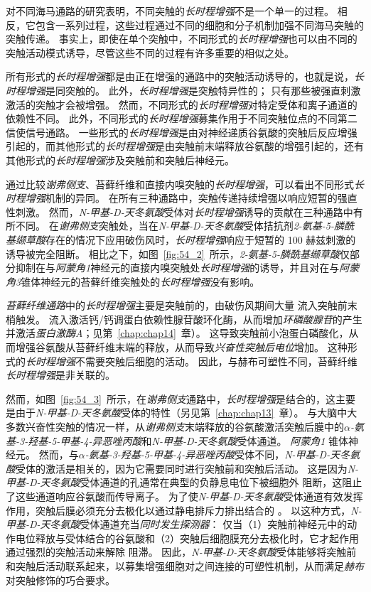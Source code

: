 对不同海马通路的研究表明，不同突触的\textit{长时程增强}不是一个单一的过程。
相反，它包含一系列过程，这些过程通过不同的细胞和分子机制加强不同海马突触的突触传递。
事实上，即使在单个突触中，不同形式的\textit{长时程增强}也可以由不同的突触活动模式诱导，尽管这些不同的过程有许多重要的相似之处。


所有形式的\textit{长时程增强}都是由正在增强的通路中的突触活动诱导的，也就是说，\textit{长时程增强}是同突触的。
此外，\textit{长时程增强}是突触特异性的；
只有那些被强直刺激激活的突触才会被增强。
然而，不同形式的\textit{长时程增强}对特定受体和离子通道的依赖性不同。 此外，不同形式的\textit{长时程增强}募集作用于不同突触位点的不同第二信使信号通路。
一些形式的\textit{长时程增强}是由对神经递质谷氨酸的突触后反应增强引起的，而其他形式的\textit{长时程增强}是由突触前末端释放谷氨酸的增强引起的，还有其他形式的\textit{长时程增强}涉及突触前和突触后神经元。


通过比较\textit{谢弗侧支}、苔藓纤维和直接内嗅突触的\textit{长时程增强}，可以看出不同形式\textit{长时程增强}机制的异同。
在所有三种通路中，突触传递持续增强以响应短暂的强直性刺激。
然而，\textit{N-甲基-D-天冬氨酸}受体对\textit{长时程增强}诱导的贡献在三种通路中有所不同。
在\textit{谢弗侧支}突触处，当在\textit{N-甲基-D-天冬氨酸}受体拮抗剂\textit{2-氨基-5-膦酰基缬草酸}存在的情况下应用破伤风时，\textit{长时程增强}响应于短暂的 100 赫兹刺激的诱导被完全阻断。
相比之下，如图~\ref{fig:54_2}~所示，\textit{2-氨基-5-膦酰基缬草酸}仅部分抑制在与\textit{阿蒙角1}神经元的直接内嗅突触处\textit{长时程增强}的诱导，并且对在与\textit{阿蒙角3}锥体神经元的苔藓纤维突触处的\textit{长时程增强}没有影响。


\textit{苔藓纤维通路}中的\textit{长时程增强}主要是突触前的，由破伤风期间大量  流入突触前末梢触发。
 流入激活钙/钙调蛋白依赖性腺苷酸环化酶，从而增加\textit{环磷酸腺苷}的产生并激活\textit{蛋白激酶A}；见第~\ref{chap:chap14}~章）。
这导致突触前小泡蛋白磷酸化，从而增强谷氨酸从苔藓纤维末端的释放，从而导致\textit{兴奋性突触后电位}增加。
这种形式的\textit{长时程增强}不需要突触后细胞的活动。
因此，与赫布可塑性不同，苔藓纤维\textit{长时程增强}是非关联的。


然而，如图~\ref{fig:54_3}~所示，在\textit{谢弗侧支}通路中，\textit{长时程增强}是结合的，这主要是由于\textit{N-甲基-D-天冬氨酸}受体的特性（另见第~\ref{chap:chap13}~章）。
与大脑中大多数兴奋性突触的情况一样，从\textit{谢弗侧支}末端释放的谷氨酸激活突触后膜中的\textit{$\alpha$-氨基-3-羟基-5-甲基-4-异恶唑丙酸}和\textit{N-甲基-D-天冬氨酸}受体通道。
\textit{阿蒙角1} 锥体神经元。
然而，与\textit{$\alpha$-氨基-3-羟基-5-甲基-4-异恶唑丙酸}受体不同，\textit{N-甲基-D-天冬氨酸}受体的激活是相关的，因为它需要同时进行突触前和突触后活动。
这是因为\textit{N-甲基-D-天冬氨酸}受体通道的孔通常在典型的负静息电位下被细胞外  阻断，这阻止了这些通道响应谷氨酸而传导离子。
为了使\textit{N-甲基-D-天冬氨酸}受体通道有效发挥作用，突触后膜必须充分去极化以通过静电排斥力排出结合的 。
以这种方式，\textit{N-甲基-D-天冬氨酸}受体通道充当\textit{同时发生探测器}：
仅当（1）突触前神经元中的动作电位释放与受体结合的谷氨酸和（2）突触后细胞膜充分去极化时，它才起作用 通过强烈的突触活动来解除  阻滞。
因此，\textit{N-甲基-D-天冬氨酸}受体能够将突触前和突触后活动联系起来，以募集增强细胞对之间连接的可塑性机制，从而满足\textit{赫布}对突触修饰的巧合要求。


